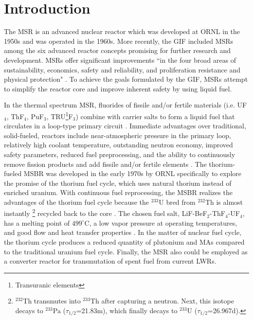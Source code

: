 \section{Introduction}
The \gls{MSR} is an advanced nuclear reactor which was developed at \gls{ORNL} 
in the 1950s and was operated in the 1960s. More recently, the \gls{GIF}  
included \glspl{MSR} among the six advanced reactor concepts promising for 
further research and development. 
\glspl{MSR} offer significant improvements ``in the four broad areas of 
sustainability, economics, safety and reliability, and proliferation resistance 
and physical protection" \cite{doe_technology_2002}. To achieve the goals 
formulated by the GIF, \glspl{MSR} attempt to simplify the reactor core and 
improve inherent safety by using liquid fuel.

In the thermal spectrum \gls{MSR}, fluorides of fissile and/or fertile 
materials (i.e. UF$_4$, ThF$_4$,  PuF$_3$, TRU\footnote{ Transuranic 
elements}F$_3$) combine with carrier salts to form a liquid fuel that 
circulates in a loop-type primary circuit \cite{haubenreich_experience_1970}. 
Immediate advantages over traditional, solid-fueled, reactors include 
near-atmospheric pressure in the primary loop, 
relatively high coolant temperature, outstanding neutron economy, improved 
safety parameters, reduced fuel preprocessing, and the ability to continuously 
remove fission products and add fissile and/or fertile elements 
\cite{leblanc_molten_2010}. The thorium-fueled \gls{MSBR} was developed in the 
early 1970s by \gls{ORNL} specifically to explore the promise of the thorium 
fuel cycle, which uses natural thorium instead of enriched uranium. With 
continuous fuel reprocessing, the \gls{MSBR} realizes the advantages of the 
thorium fuel cycle because the $^{233}$U bred from 
$^{232}$Th is almost instantly \footnote{\space $^{232}$Th transmutes into 
$^{233}$Th after capturing a neutron. Next, this isotope decays to $^{233}$Pa 
($\tau_{1/2}$=21.83m), which finally decays to $^{233}$U 
($\tau_{1/2}$=26.967d).} recycled back to the core 
\cite{betzler_modeling_2016}. The chosen fuel salt, LiF-BeF$_2$-ThF$_4$-UF$_4$, has a 
melting point of $499^\circ$C, a low vapor pressure at operating temperatures, 
and good flow and heat transfer properties \cite{robertson_conceptual_1971}. In 
the matter of nuclear fuel cycle, the thorium cycle produces a reduced quantity 
of plutonium and \glspl{MA} compared to the traditional uranium fuel cycle. 
Finally, the \gls{MSR} also could be employed as a converter reactor for 
transmutation of spent fuel from current \glspl{LWR}.

